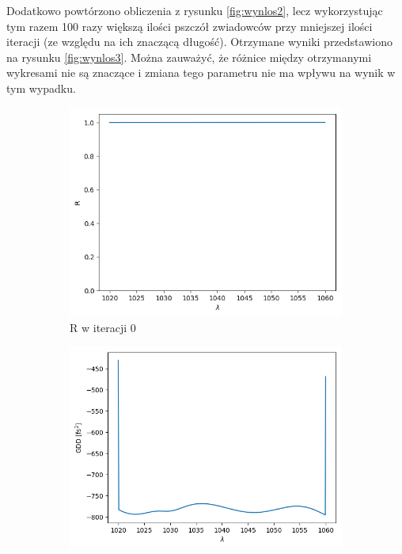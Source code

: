 Dodatkowo powtórzono obliczenia z rysunku \ref{fig:wynlos2}, lecz wykorzystując tym razem 100 razy większą ilości pszczół zwiadowców przy mniejszej ilości iteracji (ze względu na ich znaczącą długość). Otrzymane wyniki przedstawiono na rysunku \ref{fig:wynlos3}. Można zauważyć, że różnice między otrzymanymi wykresami nie są znaczące i zmiana tego parametru nie ma wpływu na wynik w tym wypadku.

\begin{figure} [H]
    \centering
    \begin{subfigure}[b]{0.30\textwidth}
        \includegraphics[width=\linewidth]{figures/wyniki/losowe/dbr_opt10/result_Rresult0.png}
        \caption{R w iteracji 0}
    \end{subfigure}
            \begin{subfigure}[b]{0.31\textwidth}
        \includegraphics[width=\linewidth]{figures/wyniki/losowe/dbr_opt10/result_gddresult0.png}

\end{subfigure}
\end{figure}
